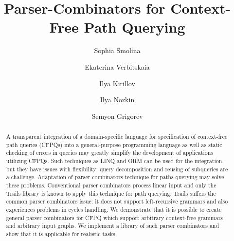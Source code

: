 \documentclass[sigconf]{acmart}
\begin{document}
\title{Parser-Combinators for Context-Free Path Querying}


\author{Sophia Smolina}

\author{Ekaterina Verbitskaia}

\author{Ilya Kirillov}

\author{Ilya Nozkin}


\author{Semyon Grigorev}

\renewcommand{\shortauthors}{Smolina et al.}

\begin{abstract}
A transparent integration of a domain-specific language for specification of context-free path queries (CFPQs) into a general-purpose programming language as well as static checking of errors in queries may greatly simplify the development of applications utilizing CFPQs.  
Such techniques as LINQ and ORM can be used for the integration, but they have issues with flexibility: query decomposition and reusing of subqueries are a challenge.
Adaptation of parser combinators technique for paths querying may solve these problems. 
Conventional parser combinators process linear input and only the Trails library is known to apply this technique for path querying.
Trails suffers the common parser combinators issue: it does not support left-recursive grammars and also experiences problems in cycles handling.
We demonstrate that it is possible to create general parser combinators for CFPQ which support arbitrary context-free grammars and arbitrary input graphs.
We implement a library of such parser combinators and show that it is applicable for realistic tasks.
\end{abstract}
\end{document}
